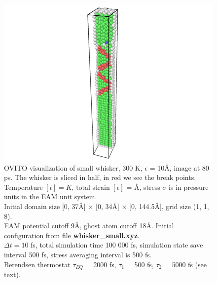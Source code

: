 \documentclass[12pt,a4paper]{article}
\begin{document}
\begin{figure}[h!]
	\centering
	\includegraphics[width=.85\linewidth]{img/milestone09-small-300-10-pic.png}
	\caption{OVITO visualization of small whisker, 300 K, $\epsilon$ = 10Å,  image at 80 ps. The whisker is sliced in half, in red we see the break points.\\
	Temperature $[t]=K$, total strain $[\epsilon]$ = Å, stress $\sigma$ is in pressure units in the EAM unit system.\\
	Initial domain size [0, 37Å] $\times$ [0, 34Å] $\times$ [0, 144.5Å], grid size (1, 1, 8).\\
	EAM potential cutoff 9Å, ghost atom cutoff 18Å. Initial configuration from file {\bf whisker\_small.xyz}.\\
	$\Delta t = 10$ fs, total simulation time 100 000 fs, simulation state save interval 500 fs, stress averaging interval is 500 fs.\\
	Berendsen thermostat $\tau_{EQ}$ = 2000 fs, $\tau_1$ = 500 fs, $\tau_2$ = 5000 fs (see text).
	}
	\label{fig:whisker-small-defect}
\end{figure}
\end{document}
